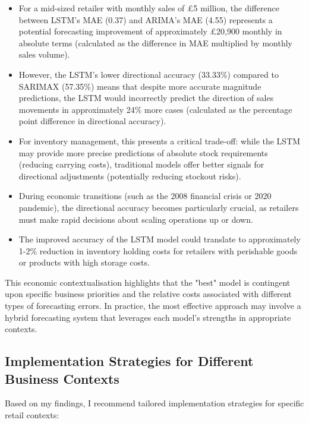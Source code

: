 \documentclass[12pt,a4paper]{report}
\begin{document}
\begin{itemize}
    \item For a mid-sized retailer with monthly sales of £5 million, the difference between LSTM's MAE (0.37) and ARIMA's MAE (4.55) represents a potential forecasting improvement of approximately £20,900 monthly in absolute terms (calculated as the difference in MAE multiplied by monthly sales volume).
    
    \item However, the LSTM's lower directional accuracy (33.33\%) compared to SARIMAX (57.35\%) means that despite more accurate magnitude predictions, the LSTM would incorrectly predict the direction of sales movements in approximately 24\% more cases (calculated as the percentage point difference in directional accuracy).
    
    \item For inventory management, this presents a critical trade-off: while the LSTM may provide more precise predictions of absolute stock requirements (reducing carrying costs), traditional models offer better signals for directional adjustments (potentially reducing stockout risks).
    
    \item During economic transitions (such as the 2008 financial crisis or 2020 pandemic), the directional accuracy becomes particularly crucial, as retailers must make rapid decisions about scaling operations up or down.
    
    \item The improved accuracy of the LSTM model could translate to approximately 1-2\% reduction in inventory holding costs for retailers with perishable goods or products with high storage costs.
\end{itemize}

This economic contextualisation highlights that the "best" model is contingent upon specific business priorities and the relative costs associated with different types of forecasting errors. In practice, the most effective approach may involve a hybrid forecasting system that leverages each model's strengths in appropriate contexts.

\subsection{Implementation Strategies for Different Business Contexts}
Based on my findings, I recommend tailored implementation strategies for specific retail contexts:
\end{document}
